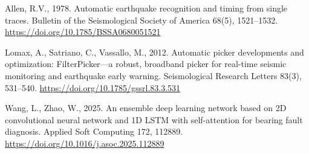 \documentclass[11pt,a4paper]{article}
\begin{document}
\begin{description}\setlength{\itemsep}{2pt}\small
\item[] Allen, R.V., 1978. Automatic earthquake recognition and timing from single
  traces. Bulletin of the Seismological Society of America 68(5), 1521--1532.
  \url{https://doi.org/10.1785/BSSA0680051521}
\item[] Lomax, A., Satriano, C., Vassallo, M., 2012. Automatic picker developments
  and optimization: FilterPicker---a robust, broadband picker for real-time seismic
  monitoring and earthquake early warning. Seismological Research Letters 83(3),
  531--540. \url{https://doi.org/10.1785/gssrl.83.3.531}
\item[] Wang, L., Zhao, W., 2025. An ensemble deep learning network based on 2D
  convolutional neural network and 1D LSTM with self-attention for bearing fault
  diagnosis. Applied Soft Computing 172, 112889.
  \url{https://doi.org/10.1016/j.asoc.2025.112889}
\end{description}
\end{document}
